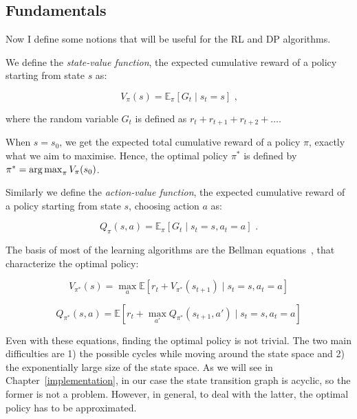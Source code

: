 \subsection{Fundamentals}

Now I define some notions that will be useful for the RL and DP algorithms.


We define the \textit{state-value function}, the expected cumulative reward of a policy starting from state $s$ as:

\begin{equation}\label{eq:statevalueFunction}
V_{\pi}(s)=\mathbb{E}_\pi[G_t \mid s_t = s] \text{ ,}
\end{equation}

where the random variable $G_t$ is defined as $r_{t} +  r_{t+1} + r_{t+2} + \ldots$.

When $s=s_0$, we get the expected total cumulative reward of a policy $\pi$, exactly what we aim to maximise. Hence, the optimal policy $\pi^*$ is defined by $\pi^* = \operatorname*{arg\,max}_{\pi} V_{\pi}(s_0)$.


Similarly we define the \textit{action-value function}, the expected cumulative reward of a policy starting from state $s$, choosing action $a$ as:

\begin{equation}\label{eq:actionvalueFunction}
Q_{\pi}(s, a)=\mathbb{E}_\pi[G_t \mid s_t = s, a_t = a] \text{ .}
\end{equation}


The basis of most of the learning algorithms are the Bellman equations~\cite{bellman1957bellmanequation}, that characterize the optimal policy:


\begin{equation}\label{eq:bellmanState}
V_{\pi^*}(s) = \max_a \mathbb{E} [r_t + V_{\pi^*}(s_{t+1}) \mid s_t=s, a_t=a]
\end{equation}


\begin{equation} \label{eq:bellmanAction}
Q_{\pi^*}(s,a) = \mathbb{E} [r_t + \max_{a'} Q_{\pi^*}(s_{t+1},a') \mid s_t=s, a_t=a ] 
\end{equation}


Even with these equations, finding the optimal policy is not trivial. The two main difficulties are 1) the possible cycles while moving around the state space and 2) the exponentially large size of the state space. As we will see in Chapter~\ref{implementation}, in our case the state transition graph is acyclic, so the former is not a problem. However, in general, to deal with the latter, the optimal policy has to be approximated.



